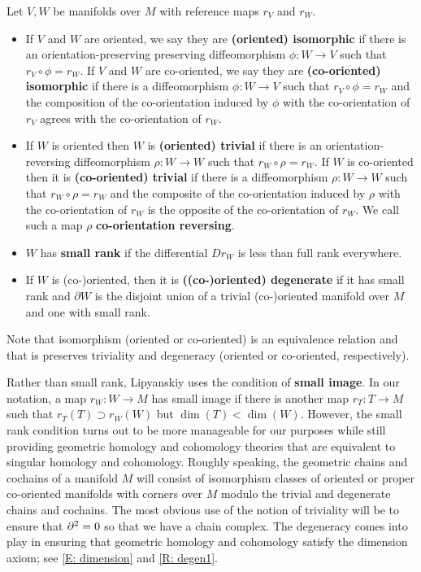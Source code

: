 \begin{definition}\label{D: equiv, triv, and small}
 Let $V, W$ be manifolds over $M$ with reference maps $r_V$ and $r_W$.
	\begin{itemize}
		\item If $V$ and $W$ are oriented, we say they are \textbf{(oriented) isomorphic} if there is an orientation-preserving preserving diffeomorphism $\phi \colon W \to V$ such that $r_V \circ \phi = r_W$. If $V$ and $W$ are co-oriented, we say they are \textbf{(co-oriented) isomorphic} if there is a diffeomorphism $\phi \colon W \to V$ such that $r_V \circ \phi = r_W$ and the composition of the
co-orientation induced by $\phi$
with the co-orientation of $r_V$ agrees with the co-orientation of $r_W$.


		\item If $W$ is oriented then $W$ is \textbf{(oriented) trivial} if there is an orientation-reversing
 diffeomorphism $\rho \colon W \to W$ such that $r_W \circ \rho = r_W$. If $W$ is co-oriented then it is \textbf{(co-oriented) trivial} if there is a diffeomorphism $\rho:W \to W$ such that $r_W \circ \rho = r_W$ and
		the composite of the co-orientation induced by $\rho$ with the co-orientation of $r_W$ is the opposite of the co-orientation of $r_W$. We call such a map $\rho$ \textbf{co-orientation reversing}.

\item $W$ has \textbf{small rank} if the differential $D r_W$ is less than full rank everywhere.
		\item If $W$ is (co-)oriented, then it is \textbf{((co-)oriented) degenerate} if it has small rank and ${\partial W}$ is the disjoint union of a trivial (co-)oriented
		manifold over $M$ and one with small rank.
	\end{itemize}
\end{definition}

Note that isomorphism (oriented or co-oriented) is an equivalence relation and that is preserves triviality and degeneracy (oriented or co-oriented, respectively).




Rather than small rank, Lipyanskiy uses the condition of \textbf{small image}. In our notation, a map $r_W \colon W \to M$ has small image if there is another map $r_T:T \to M$ such that $r_T(T)\supset r_W(W)$ but $\dim(T)<\dim(W)$. However, the small rank condition turns out to be more manageable for our purposes while still providing geometric homology and cohomology theories that are equivalent to singular homology and cohomology. Roughly speaking, the geometric chains and cochains of a manifold $M$ will consist of isomorphism classes of oriented or proper co-oriented manifolds with corners over $M$ modulo the trivial and degenerate chains and cochains. The most obvious use of the notion of triviality will be to ensure that $\partial^2 = 0$ so that we have a chain complex. The degeneracy comes into play in ensuring that geometric homology and cohomology satisfy the dimension axiom; see \cref{E: dimension} and \cref{R: degen1}.







